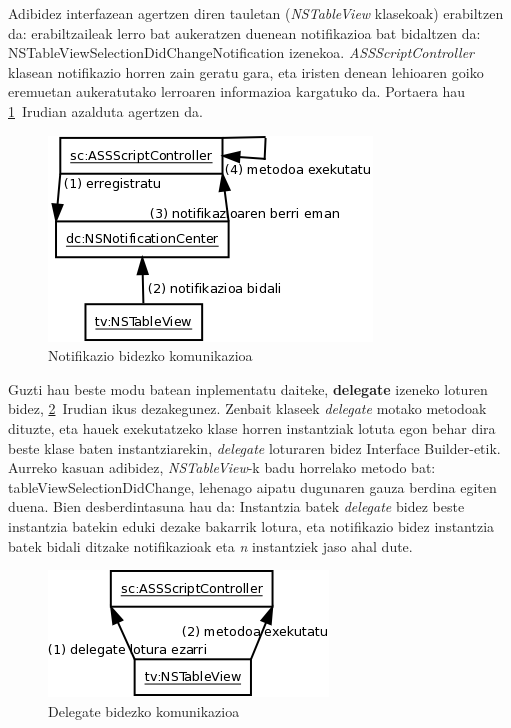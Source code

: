 Adibidez interfazean agertzen diren tauletan (\textit{NSTableView} klasekoak) erabiltzen da: erabiltzaileak lerro bat aukeratzen duenean notifikazioa bat bidaltzen da: NSTableViewSelectionDidChangeNotification izenekoa. \textit{ASSScriptController} klasean notifikazio horren zain geratu gara, eta iristen denean lehioaren goiko eremuetan aukeratutako lerroaren informazioa kargatuko da. Portaera hau \ref{notification}~Irudian azalduta agertzen da.
\begin{figure}[htp]
\begin{center}
\includegraphics[scale=0.4]{Pictures/Chapter4/Diseinua/notification.png}
\caption{Notifikazio bidezko komunikazioa}
\label{notification}
\end{center}
\end{figure}

Guzti hau beste modu batean inplementatu daiteke, \textbf{delegate} izeneko loturen bidez, \ref{delegate}~Irudian ikus dezakegunez. Zenbait klaseek \textit{delegate} motako metodoak dituzte, eta hauek exekutatzeko klase horren instantziak lotuta egon behar dira beste klase baten instantziarekin, \textit{delegate} loturaren bidez Interface Builder-etik. Aurreko kasuan adibidez, \textit{NSTableView}-k badu horrelako metodo bat: tableViewSelectionDidChange, lehenago aipatu dugunaren gauza berdina egiten duena. Bien desberdintasuna hau da: Instantzia batek \textit{delegate} bidez beste instantzia batekin eduki dezake bakarrik lotura, eta notifikazio bidez instantzia batek bidali ditzake notifikazioak eta \textit{n} instantziek jaso ahal dute.
\begin{figure}[htp]
\begin{center}
\includegraphics[scale=0.4]{Pictures/Chapter4/Diseinua/delegate.png}
\caption{Delegate bidezko komunikazioa}
\label{delegate}
\end{center}
\end{figure}

